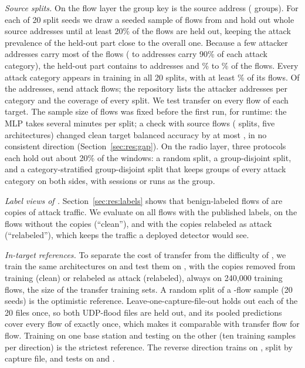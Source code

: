 \emph{Source splits.} On the flow layer the group key is the source address (\NSrcGroups{} groups). For each of 20 split seeds we draw a seeded sample of \NSub{} flows from \DA{} and hold out whole source addresses until at least 20\% of the flows are held out, keeping the attack prevalence of the held-out part close to the overall one. Because a few attacker addresses carry most of the flows (\RCovAddrNinetyMin{} to \RCovAddrNinetyMax{} addresses carry 90\% of each attack category), the held-out part contains \RCovTestGroupsMin{} to \RCovTestGroupsMax{} addresses and \RCovTestFlowsMin\% to \RCovTestFlowsMax\% of the flows. Every attack category appears in training in all 20 splits, with at least \RCovMinTrainShare\% of its flows. Of the \NSrcGroups{} addresses, \RCovAttackers{} send attack flows; the repository lists the attacker addresses per category and the coverage of every split. We test transfer on every flow of each target. The sample size of \NSub{} flows was fixed before the first run, for runtime: the MLP takes several minutes per split; a check with \RSzNlist{} source flows (\RSzSplits{} splits, five architectures) changed clean target balanced accuracy by at most \RSzMaxChangeClean{}, in no consistent direction (Section~\ref{sec:res:gap}). On the radio layer, three protocols each hold out about 20\% of the windows: a random split, a group-disjoint split, and a category-stratified group-disjoint split that keeps groups of every attack category on both sides, with sessions or runs as the group.

\emph{Label views of \DB{}.} Section~\ref{sec:res:labels} shows that \RCopies{} benign-labeled flows of \DB{} are copies of attack traffic. We evaluate on all flows with the published labels, on the flows without the copies (``clean''), and with the copies relabeled as attack (``relabeled''), which keeps the traffic a deployed detector would see.

\emph{In-target references.} To separate the cost of transfer from the difficulty of \DB{}, we train the same architectures on \DB{} and test them on \DB{}, with the copies removed from training (clean) or relabeled as attack (relabeled), always on 240,000 training flows, the size of the transfer training sets. A random split of a \NSub-flow sample (20 seeds) is the optimistic reference. Leave-one-capture-file-out holds out each of the 20 files once, so both UDP-flood files are held out, and its pooled predictions cover every flow of \DB{} exactly once, which makes it comparable with transfer flow for flow. Training on one base station and testing on the other (ten training samples per direction) is the strictest reference. The reverse direction trains on \DB{}, split by capture file, and tests on \DA{} and \DC{}.

